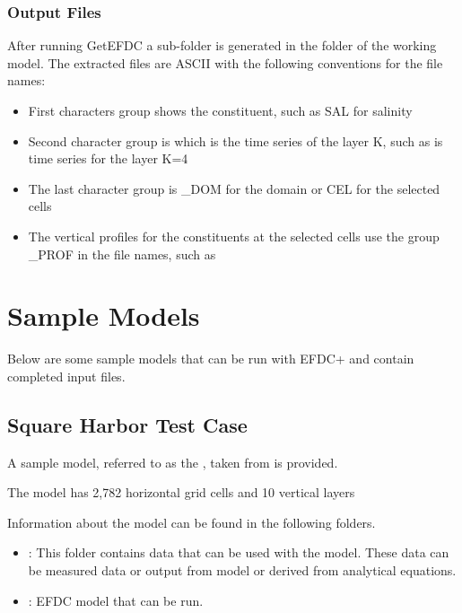 \documentclass[letterpaper,10pt,english]{sphinxmanual}
\begin{document}
\subsubsection{Output Files}
\label{\detokenize{outputfiles/getefdc:output-files}}
After running GetEFDC a sub-folder  is generated in the folder  of the
working model. The extracted files are ASCII with the following conventions for the file
names:
\begin{itemize}
\item {} 
First characters group shows the constituent, such as SAL for salinity

\item {} 
Second character group is  which is the time series of the layer K, such as
 is time series for the layer K=4

\item {} 
The last character group is \_DOM for the domain or CEL for the selected cells

\item {} 
The vertical profiles for the constituents at the selected cells use the group \_PROF
in the file names, such as 

\end{itemize}


\section{Sample Models}
\label{\detokenize{samplemodels/index:sample-models}}\label{\detokenize{samplemodels/index:samplemodels}}\label{\detokenize{samplemodels/index::doc}}
Below are some sample models that can be run with EFDC+ and contain completed input files.


\subsection{Square Harbor Test Case}
\label{\detokenize{samplemodels/squareharbor:square-harbor-test-case}}\label{\detokenize{samplemodels/squareharbor:squareharbor}}\label{\detokenize{samplemodels/squareharbor::doc}}
A sample model, referred to as the , taken from  is provided.

The model has 2,782 horizontal grid cells and 10 vertical layers

Information about the model can be found in the following folders.
\begin{itemize}
\item {} 
: This folder contains data that can be used with the model. These data can be measured data or output from model or derived from analytical equations.

\item {} 
: EFDC model that can be run.

\end{itemize}
\end{document}
